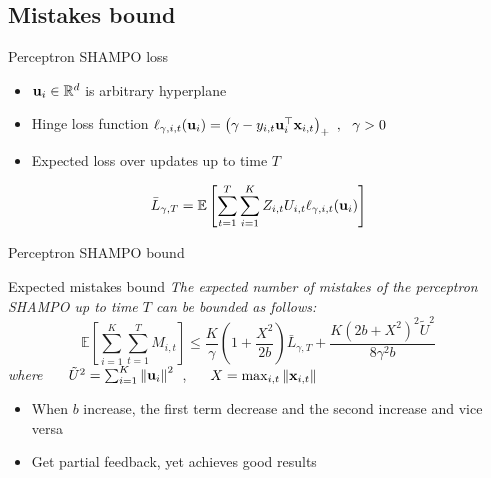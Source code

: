 \documentclass{beamer}
\begin{document}
\subsection{Mistakes bound}
\begin{frame}{Perceptron SHAMPO  loss}
\begin{itemize}
\item $\mathbf{u}_i\in\mathbb{R}^d$ is arbitrary hyperplane \newline
\item Hinge loss function $\ell_{\gamma,i,t}(\mathbf{u}_{i})= \left({\gamma-y_{i,t}
  {\mathbf{u}}^{\top}_{i}\mathbf{x}_{i,t}}\right)_{+}~,~~\gamma>0$ \newline
\item Expected loss over updates up to time $T$
\end{itemize}
\begin{equation*}
 \bar{L}_{\gamma,T}=\mathbb{E}\brackets{\sum_{t=1}^T \sum_{i=1}^{K}{Z_{i,t}U_{i,t}\lossp{\gamma,i,t}(\vui{i})}}\newline
\end{equation*}
\end{frame}


\begin{frame}{Perceptron SHAMPO bound}
\begin{block}{Expected mistakes bound}
\emph{The expected number of mistakes  of the perceptron SHAMPO  up to time $T$ can be bounded as follows:}
\begin{displaymath}
\mathbb{E}\left[ \sum_{i=1}^{K}\sum_{t=1}^{T}{M_{i,t}} \right]
\le \frac{K}{\gamma}\left(1+\frac{X^2}{2b} \right){\bar L}_{\gamma,T}
+\frac{K\left({2b+X^2}\right)^2\tilde{U}^2}{8{\gamma}^2b}~
\end{displaymath}
\emph{where}~~~ $\tilde{U}^2=\sum_{i=1}^{K}\left\Vert {\mathbf{u}_{i}} \right\Vert^2$~, ~~ $X=\max_{i,t}\Vert\mathbf{x}_{i,t}\Vert$
\end{block}
\begin{itemize}

\item When $b$ increase, the first term decrease and the second increase and vice versa\newline
\item Get partial feedback, yet achieves good results
\end{itemize}
\end{frame}
\end{document}
